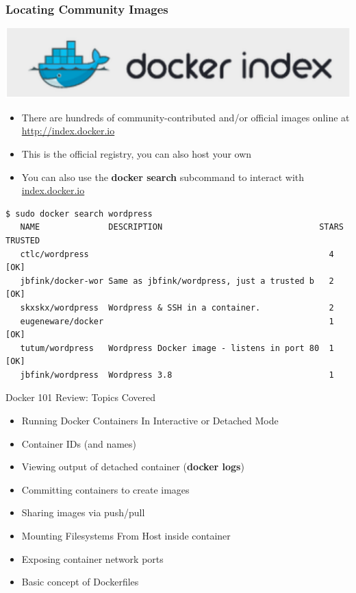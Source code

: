 \documentclass[xcolor=dvipsnames]{beamer}
\newcommand{\cpause}{}
\begin{document}
\begin{frame}[fragile]
  \frametitle{Locating Community Images}

  \cpause
  \includegraphics[width=\textwidth]{figures/docker-index.pdf}

  \begin{itemize}
  \item There are hundreds of community-contributed and/or official images online at \url{http://index.docker.io} \cpause
  \item This is the official registry, you can also host your own
  \item You can also use the \textbf{docker search} subcommand to interact with \url{index.docker.io} \cpause
  \end{itemize}

  \begin{lstlisting}[basicstyle=\tiny]
   $ sudo docker search wordpress
   NAME              DESCRIPTION                                STARS TRUSTED
   ctlc/wordpress                                                 4    [OK]
   jbfink/docker-wor Same as jbfink/wordpress, just a trusted b   2    [OK]
   skxskx/wordpress  Wordpress & SSH in a container.              2
   eugeneware/docker                                              1    [OK]
   tutum/wordpress   Wordpress Docker image - listens in port 80  1    [OK]
   jbfink/wordpress  Wordpress 3.8                                1
  \end{lstlisting}

\end{frame}

\begin{frame}{Docker 101 Review: Topics Covered}  

  \begin{itemize}
  \item Running Docker Containers In Interactive or Detached Mode \cpause
  \item Container IDs (and names) \cpause
  \item Viewing output of detached container (\textbf{docker logs}) \cpause
  \item Committing containers to create images \cpause
  \item Sharing images via push/pull \cpause
  \item Mounting Filesystems From Host inside container \cpause
  \item Exposing container network ports \cpause
  \item Basic concept of Dockerfiles
  \end{itemize}
\end{frame}
\end{document}
